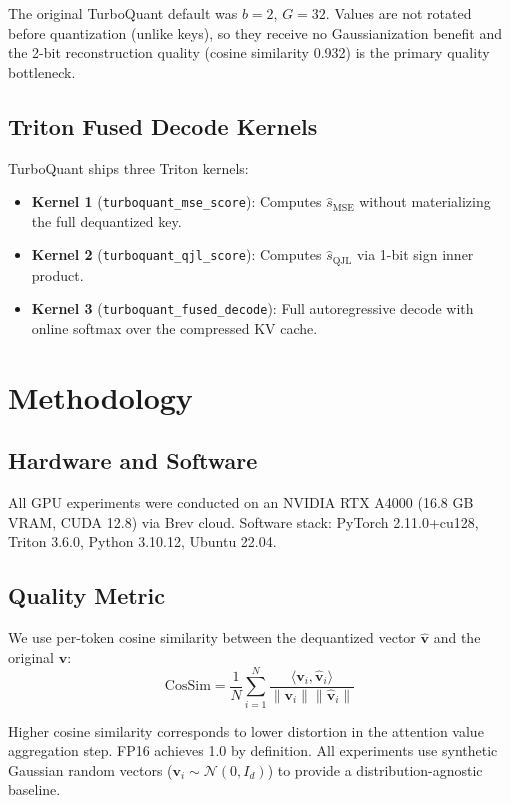\documentclass[10pt,twocolumn]{article}
\newcommand{\bm}[1]{\boldsymbol{#1}}
\begin{document}
The original TurboQuant default was $b = 2$, $G = 32$. Values are not rotated before quantization (unlike keys), so they receive no Gaussianization benefit and the 2-bit reconstruction quality (cosine similarity 0.932) is the primary quality bottleneck.

\subsection{Triton Fused Decode Kernels}

TurboQuant ships three Triton kernels:
\begin{itemize}
\item \textbf{Kernel 1} (\texttt{turboquant\_mse\_score}): Computes $\hat{s}_\text{MSE}$ without materializing the full dequantized key.
\item \textbf{Kernel 2} (\texttt{turboquant\_qjl\_score}): Computes $\hat{s}_\text{QJL}$ via 1-bit sign inner product.
\item \textbf{Kernel 3} (\texttt{turboquant\_fused\_decode}): Full autoregressive decode with online softmax over the compressed KV cache.
\end{itemize}

\section{Methodology}
\label{sec:methodology}

\subsection{Hardware and Software}

All GPU experiments were conducted on an NVIDIA RTX A4000 (16.8 GB VRAM, CUDA 12.8) via Brev cloud. Software stack: PyTorch 2.11.0+cu128, Triton 3.6.0, Python 3.10.12, Ubuntu 22.04.

\subsection{Quality Metric}

We use per-token cosine similarity between the dequantized vector $\hat{\bm{v}}$ and the original $\bm{v}$:
$$\text{CosSim} = \frac{1}{N} \sum_{i=1}^N \frac{\langle \bm{v}_i, \hat{\bm{v}}_i \rangle}{\|\bm{v}_i\| \|\hat{\bm{v}}_i\|}$$

Higher cosine similarity corresponds to lower distortion in the attention value aggregation step. FP16 achieves 1.0 by definition. All experiments use synthetic Gaussian random vectors ($\bm{v}_i \sim \mathcal{N}(0, I_d)$) to provide a distribution-agnostic baseline.
\end{document}
